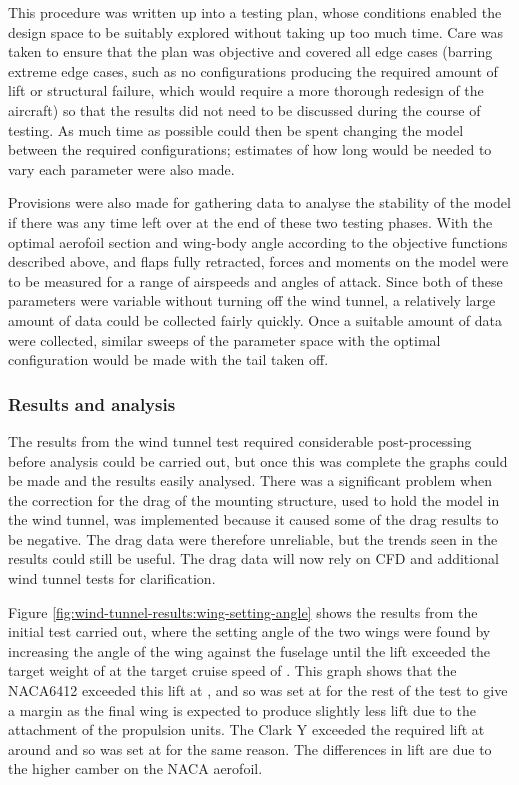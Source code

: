 \documentclass[../../main.tex]{subfiles}
\begin{document}
This procedure was written up into a testing plan, whose conditions enabled the design space to be suitably explored without taking up too much time.
Care was taken to ensure that the plan was objective and covered all edge cases (barring extreme edge cases, such as no configurations producing the required amount of lift or structural failure, which would require a more thorough redesign of the aircraft) so that the results did not need to be discussed during the course of testing.
As much time as possible could then be spent changing the model between the required configurations; estimates of how long would be needed to vary each parameter were also made.

Provisions were also made for gathering data to analyse the stability of the model if there was any time left over at the end of these two testing phases.
With the optimal aerofoil section and wing-body angle according to the objective functions described above, and flaps fully retracted, forces and moments on the model were to be measured for a range of airspeeds and angles of attack.
Since both of these parameters were variable without turning off the wind tunnel, a relatively large amount of data could be collected fairly quickly.
Once a suitable amount of data were collected, similar sweeps of the parameter space with the optimal configuration would be made with the tail taken off.

\subsubsection{Results and analysis} \label{sec:design-process:interim-design-review:wind-tunnel-test:results-and-analysis}

The results from the wind tunnel test required considerable post-processing before analysis could be carried out, but once this was complete the graphs could be made and the results easily analysed.
There was a significant problem when the correction for the drag of the mounting structure, used to hold the model in the wind tunnel, was implemented because it caused some of the drag results to be negative.
The drag data were therefore unreliable, but the trends seen in the results could still be useful.
The drag data will now rely on CFD and additional wind tunnel tests for clarification.

Figure \ref{fig:wind-tunnel-results:wing-setting-angle} shows the results from the initial test carried out, where the setting angle of the two wings were found by increasing the angle of the wing against the fuselage until the lift exceeded the target weight of  at the target cruise speed of .
This graph shows that the NACA6412 exceeded this lift at , and so was set at  for the rest of the test to give a margin as the final wing is expected to produce slightly less lift due to the attachment of the propulsion units.
The Clark Y exceeded the required lift at around  and so was set at  for the same reason.  The differences in lift are due to the higher camber on the NACA aerofoil.
\end{document}
